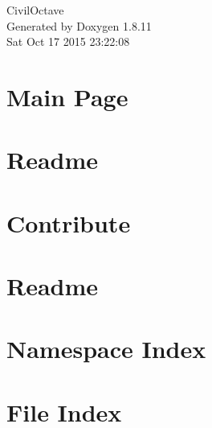 \documentclass[twoside]{book}
\newcommand{\+}{\discretionary{\mbox{\scriptsize$\hookleftarrow$}}{}{}}
\newcommand{\clearemptydoublepage}{%
  \newpage{\pagestyle{empty}\cleardoublepage}%
}
\begin{document}
\hypersetup{pageanchor=false,
             bookmarks=true,
             bookmarksnumbered=true,
             pdfencoding=unicode
            }
\begin{titlepage}
\vspace*{7cm}
\begin{center}%
{\Large Civil\+Octave }\\
\vspace*{1cm}
{\large Generated by Doxygen 1.8.11}\\
\vspace*{0.5cm}
{\small Sat Oct 17 2015 23:22:08}\\
\end{center}
\end{titlepage}
\clearemptydoublepage
\tableofcontents
\clearemptydoublepage
{}
\hypersetup{pageanchor=true}

\chapter{Main Page}
\label{index}\hypertarget{index}{}
\chapter{Readme}
\label{md__home_amarjeet_projects_CivilOctave_Readme}
\hypertarget{md__home_amarjeet_projects_CivilOctave_Readme}{}

\chapter{Contribute}
\label{md__home_amarjeet_projects_CivilOctave_sage_Contribute}
\hypertarget{md__home_amarjeet_projects_CivilOctave_sage_Contribute}{}

\chapter{Readme}
\label{md__home_amarjeet_projects_CivilOctave_sage_Readme}
\hypertarget{md__home_amarjeet_projects_CivilOctave_sage_Readme}{}

\chapter{Namespace Index}

\chapter{File Index}

\end{document}
